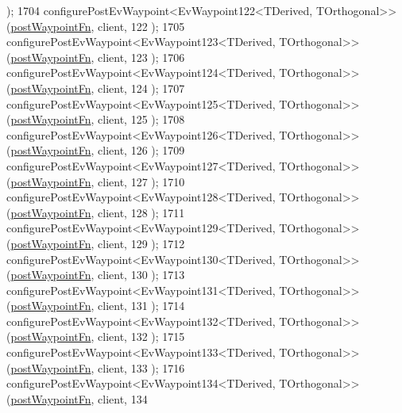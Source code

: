 \begin{DoxyCode}
      );
1704     configurePostEvWaypoint<EvWaypoint122<TDerived, TOrthogonal>>(\hyperlink{classcl__move__base__z_1_1WaypointEventDispatcher_a964a57fcce5d48ec60243230722d8dd7}{postWaypointFn}, client, 122
      );
1705     configurePostEvWaypoint<EvWaypoint123<TDerived, TOrthogonal>>(\hyperlink{classcl__move__base__z_1_1WaypointEventDispatcher_a964a57fcce5d48ec60243230722d8dd7}{postWaypointFn}, client, 123
      );
1706     configurePostEvWaypoint<EvWaypoint124<TDerived, TOrthogonal>>(\hyperlink{classcl__move__base__z_1_1WaypointEventDispatcher_a964a57fcce5d48ec60243230722d8dd7}{postWaypointFn}, client, 124
      );
1707     configurePostEvWaypoint<EvWaypoint125<TDerived, TOrthogonal>>(\hyperlink{classcl__move__base__z_1_1WaypointEventDispatcher_a964a57fcce5d48ec60243230722d8dd7}{postWaypointFn}, client, 125
      );
1708     configurePostEvWaypoint<EvWaypoint126<TDerived, TOrthogonal>>(\hyperlink{classcl__move__base__z_1_1WaypointEventDispatcher_a964a57fcce5d48ec60243230722d8dd7}{postWaypointFn}, client, 126
      );
1709     configurePostEvWaypoint<EvWaypoint127<TDerived, TOrthogonal>>(\hyperlink{classcl__move__base__z_1_1WaypointEventDispatcher_a964a57fcce5d48ec60243230722d8dd7}{postWaypointFn}, client, 127
      );
1710     configurePostEvWaypoint<EvWaypoint128<TDerived, TOrthogonal>>(\hyperlink{classcl__move__base__z_1_1WaypointEventDispatcher_a964a57fcce5d48ec60243230722d8dd7}{postWaypointFn}, client, 128
      );
1711     configurePostEvWaypoint<EvWaypoint129<TDerived, TOrthogonal>>(\hyperlink{classcl__move__base__z_1_1WaypointEventDispatcher_a964a57fcce5d48ec60243230722d8dd7}{postWaypointFn}, client, 129
      );
1712     configurePostEvWaypoint<EvWaypoint130<TDerived, TOrthogonal>>(\hyperlink{classcl__move__base__z_1_1WaypointEventDispatcher_a964a57fcce5d48ec60243230722d8dd7}{postWaypointFn}, client, 130
      );
1713     configurePostEvWaypoint<EvWaypoint131<TDerived, TOrthogonal>>(\hyperlink{classcl__move__base__z_1_1WaypointEventDispatcher_a964a57fcce5d48ec60243230722d8dd7}{postWaypointFn}, client, 131
      );
1714     configurePostEvWaypoint<EvWaypoint132<TDerived, TOrthogonal>>(\hyperlink{classcl__move__base__z_1_1WaypointEventDispatcher_a964a57fcce5d48ec60243230722d8dd7}{postWaypointFn}, client, 132
      );
1715     configurePostEvWaypoint<EvWaypoint133<TDerived, TOrthogonal>>(\hyperlink{classcl__move__base__z_1_1WaypointEventDispatcher_a964a57fcce5d48ec60243230722d8dd7}{postWaypointFn}, client, 133
      );
1716     configurePostEvWaypoint<EvWaypoint134<TDerived, TOrthogonal>>(\hyperlink{classcl__move__base__z_1_1WaypointEventDispatcher_a964a57fcce5d48ec60243230722d8dd7}{postWaypointFn}, client, 134

\end{DoxyCode}
